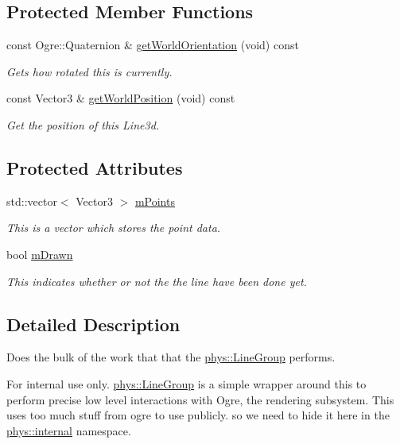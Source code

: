 \subsection*{Protected Member Functions}
\begin{DoxyCompactItemize}
\item 
const Ogre::Quaternion \& \hyperlink{classphys_1_1internal_1_1Line3D_a68aea39fc0eee3eeb744c5cd151ef209}{getWorldOrientation} (void) const 
\begin{DoxyCompactList}\small\item\em Gets how rotated this is currently. \item\end{DoxyCompactList}\item 
const Vector3 \& \hyperlink{classphys_1_1internal_1_1Line3D_a2e81ac3696fedb22bd08688f7ecba2a8}{getWorldPosition} (void) const 
\begin{DoxyCompactList}\small\item\em Get the position of this Line3d. \item\end{DoxyCompactList}\end{DoxyCompactItemize}
\subsection*{Protected Attributes}
\begin{DoxyCompactItemize}
\item 
std::vector$<$ Vector3 $>$ \hyperlink{classphys_1_1internal_1_1Line3D_acb6b813e2d713dbad02fe5a5ca1af97e}{mPoints}
\begin{DoxyCompactList}\small\item\em This is a vector which stores the point data. \item\end{DoxyCompactList}\item 
bool \hyperlink{classphys_1_1internal_1_1Line3D_a7f3a190db3c0cd83ff4fdf3d95d6f0ee}{mDrawn}
\begin{DoxyCompactList}\small\item\em This indicates whether or not the the line have been done yet. \item\end{DoxyCompactList}\end{DoxyCompactItemize}


\subsection{Detailed Description}
Does the bulk of the work that that the \hyperlink{classphys_1_1LineGroup}{phys::LineGroup} performs. \begin{DoxyInternal}{For internal use only.}
\hyperlink{classphys_1_1LineGroup}{phys::LineGroup} is a simple wrapper around this to perform precise low level interactions with Ogre, the rendering subsystem. This uses too much stuff from ogre to use publicly. so we need to hide it here in the \hyperlink{namespacephys_1_1internal}{phys::internal} namespace. \end{DoxyInternal}


